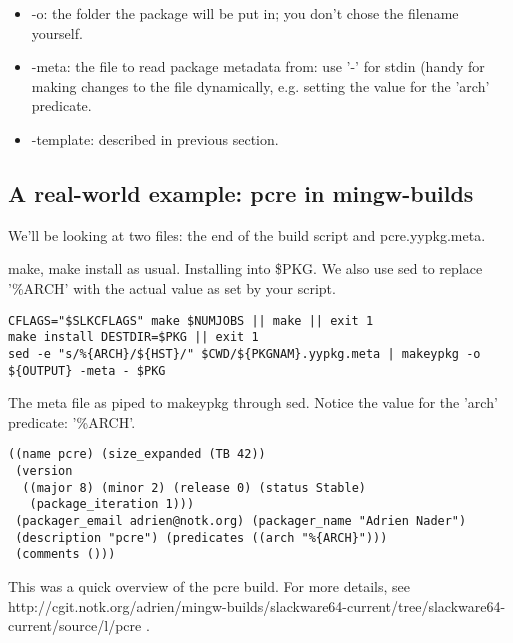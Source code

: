 \documentclass[a4paper]{article}
\begin{document}
\begin{itemize}
  \item{-o}: the folder the package will be put in; you don't chose the filename yourself.
  \item{-meta}: the file to read package metadata from: use '-' for stdin (handy for making changes to the file dynamically, e.g. setting the value for the 'arch' predicate.
  \item{-template}: described in previous section.
\end{itemize}

\subsection{A real-world example: pcre in mingw-builds}
We'll be looking at two files: the end of the build script and pcre.yypkg.meta.

make, make install as usual. Installing into \$PKG. We also use sed to replace '\%{ARCH}' with the actual value as set by your script.
\begin{verbatim}
CFLAGS="$SLKCFLAGS" make $NUMJOBS || make || exit 1
make install DESTDIR=$PKG || exit 1
sed -e "s/%{ARCH}/${HST}/" $CWD/${PKGNAM}.yypkg.meta | makeypkg -o ${OUTPUT} -meta - $PKG
\end{verbatim}

The meta file as piped to makeypkg through sed. Notice the value for the 'arch' predicate: '\%{ARCH}'.
\begin{verbatim}
((name pcre) (size_expanded (TB 42))
 (version
  ((major 8) (minor 2) (release 0) (status Stable)
   (package_iteration 1)))
 (packager_email adrien@notk.org) (packager_name "Adrien Nader")
 (description "pcre") (predicates ((arch "%{ARCH}")))
 (comments ()))
\end{verbatim}

This was a quick overview of the pcre build. For more details, see http://cgit.notk.org/adrien/mingw-builds/slackware64-current/tree/slackware64-current/source/l/pcre .
\end{document}
